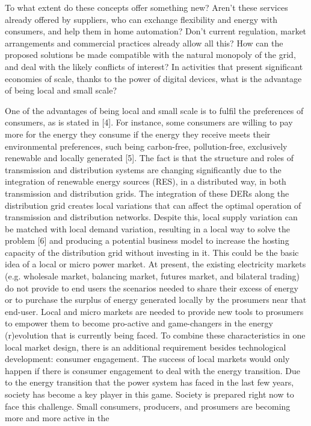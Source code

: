 \begin{tcolorbox}
To what extent do these concepts offer something new? Aren't these services already offered by suppliers, who can exchange flexibility and energy with consumers, and help them in home automation? Don't current regulation, market arrangements and commercial
practices already allow all this? How can the proposed solutions be made compatible with the natural monopoly of the grid, and deal with the likely conflicts of interest? In activities that present significant economies of scale, thanks to the power of digital devices, what is the advantage of being local and small scale?
\end{tcolorbox}

One of the advantages of being local and small scale is to fulfil the preferences of consumers, as is stated in [4]. For instance, some consumers are willing to pay more for the energy they consume if the energy they receive meets their environmental preferences, such being carbon-free, pollution-free, exclusively renewable and locally generated [5]. The fact is that the structure and roles of transmission and distribution systems are changing significantly due to the integration of renewable energy sources (RES), in a distributed way, in both transmission and distribution grids. The integration of these DERs along the distribution grid creates local variations that can affect the optimal operation of transmission and distribution networks. Despite this, local supply variation
can be matched with local demand variation, resulting in a local way to solve the problem [6] and producing a potential business model to increase the hosting capacity of the distribution grid without investing in it. This could be the basic idea of a local or micro power market. At present, the existing electricity markets (e.g. wholesale market, balancing market, futures market, and bilateral trading) do not provide to end users the scenarios needed to share their excess of energy or to purchase the surplus of  energy generated locally by the prosumers near that end-user. Local and micro markets are needed to provide new tools to prosumers to empower them to become pro-active and game-changers in the energy (r)evolution that is currently being faced. To combine these characteristics in one local market design, there is an additional requirement besides technological development: consumer engagement. The success of local markets would only happen if there is consumer engagement to deal with the energy transition. Due to the energy transition that the power system has faced in the last few years, society has become a key player in this game. Society is prepared right now to face this challenge. Small consumers, producers, and prosumers are becoming more and more active in the
